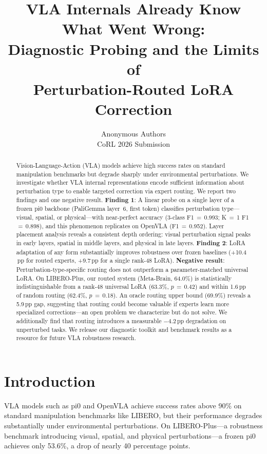 \documentclass[letterpaper]{article}
\title{VLA Internals Already Know What Went Wrong:\\Diagnostic Probing and the Limits of\\Perturbation-Routed LoRA Correction}
\author{
  Anonymous Authors\\
  CoRL 2026 Submission
}
\date{}
\newcommand{\ours}{Meta-Brain}
\newcommand{\pp}{\,\text{pp}}
\begin{document}
\maketitle

\begin{abstract}
Vision-Language-Action (VLA) models achieve high success rates on standard manipulation benchmarks but degrade sharply under environmental perturbations. We investigate whether VLA internal representations encode sufficient information about perturbation type to enable targeted correction via expert routing. We report two findings and one negative result. \textbf{Finding 1}: A linear probe on a single layer of a frozen pi0 backbone (PaliGemma layer~6, first token) classifies perturbation type---visual, spatial, or physical---with near-perfect accuracy (3-class F1\,$=$\,0.993; K\,$=$\,1 F1\,$=$\,0.898), and this phenomenon replicates on OpenVLA (F1\,$=$\,0.952). Layer placement analysis reveals a consistent depth ordering: visual perturbation signal peaks in early layers, spatial in middle layers, and physical in late layers. \textbf{Finding 2}: LoRA adaptation of any form substantially improves robustness over frozen baselines (+10.4$\pp$ for routed experts, +9.7$\pp$ for a single rank-48 LoRA). \textbf{Negative result}: Perturbation-type-specific routing does not outperform a parameter-matched universal LoRA. On LIBERO-Plus, our routed system (\ours{}, 64.0\%) is statistically indistinguishable from a rank-48 universal LoRA (63.3\%, $p$\,$=$\,0.42) and within 1.6$\pp$ of random routing (62.4\%, $p$\,$=$\,0.18). An oracle routing upper bound (69.9\%) reveals a 5.9$\pp$ gap, suggesting that routing could become valuable if experts learn more specialized corrections---an open problem we characterize but do not solve. We additionally find that routing introduces a measurable $-4.2\pp$ degradation on unperturbed tasks. We release our diagnostic toolkit and benchmark results as a resource for future VLA robustness research.
\end{abstract}

\section{Introduction}
\label{sec:intro}

VLA models such as pi0 and OpenVLA achieve success rates above 90\% on standard manipulation benchmarks like LIBERO, but their performance degrades substantially under environmental perturbations. On LIBERO-Plus---a robustness benchmark introducing visual, spatial, and physical perturbations---a frozen pi0 achieves only 53.6\%, a drop of nearly 40 percentage points.
\end{document}
